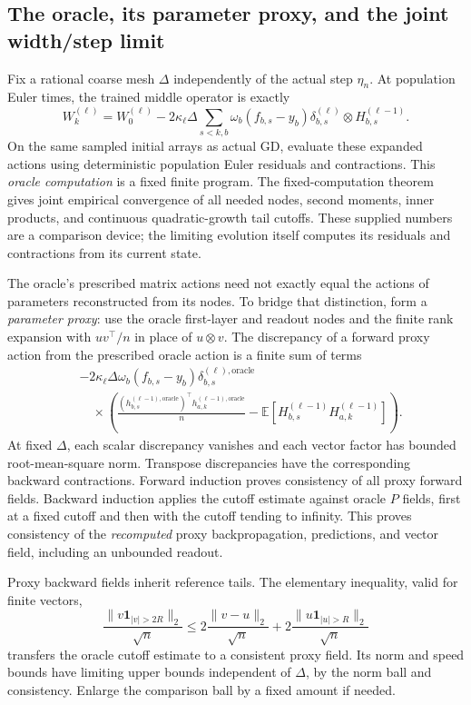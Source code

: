 \subsection{The oracle, its parameter proxy, and the joint width/step limit}
\label{app:oracle}

Fix a rational coarse mesh $\Delta$ independently of the actual step
$\eta_n$.  At population Euler times, the trained middle operator is
exactly
\[
 W_k^{(\ell)}=W_0^{(\ell)}
 -2\kappa_\ell\Delta\sum_{s<k,b}
 \omega_b(f_{b,s}-y_b)
       \delta_{b,s}^{(\ell)}\otimes H_{b,s}^{(\ell-1)}.
\]
On the same sampled initial arrays as actual GD, evaluate these expanded
actions using deterministic population Euler residuals and contractions.
This \emph{oracle computation} is a fixed finite program.  The
fixed-computation theorem gives joint empirical convergence of all
needed nodes, second moments, inner products, and continuous
quadratic-growth tail cutoffs.  These supplied numbers are a comparison
device; the limiting evolution itself computes its residuals and
contractions from its current state.

The oracle's prescribed matrix actions need not exactly equal the
actions of parameters reconstructed from its nodes.  To bridge that
distinction, form a \emph{parameter proxy}: use the oracle first-layer
and readout nodes and the finite rank expansion with
$uv^\top/n$ in place of $u\otimes v$.  The discrepancy of a forward
proxy action from the prescribed oracle action is a finite sum of terms
\begin{align*}
 &-2\kappa_\ell\Delta\omega_b(f_{b,s}-y_b)
       \delta_{b,s}^{(\ell),\mathrm{oracle}}\\
 &\quad\times\left(
 \frac{(h_{b,s}^{(\ell-1),\mathrm{oracle}})^\top
               h_{a,k}^{(\ell-1),\mathrm{oracle}}}{n}
 -\mathbb E[H_{b,s}^{(\ell-1)}H_{a,k}^{(\ell-1)}]
 \right).
\end{align*}
At fixed $\Delta$, each scalar discrepancy vanishes and each vector
factor has bounded root-mean-square norm.  Transpose discrepancies have
the corresponding backward contractions.  Forward induction proves
consistency of all proxy forward fields.  Backward induction applies
the cutoff estimate against oracle $P$ fields, first at a fixed cutoff
and then with the cutoff tending to infinity.  This proves consistency
of the \emph{recomputed} proxy backpropagation, predictions, and vector
field, including an unbounded readout.

Proxy backward fields inherit reference tails.  The elementary
inequality, valid for finite vectors,
\[
 \frac{\|v\mathbf{1}_{|v|>2R}\|_2}{\sqrt n}
 \le2\frac{\|v-u\|_2}{\sqrt n}
     +2\frac{\|u\mathbf{1}_{|u|>R}\|_2}{\sqrt n}
\]
transfers the oracle cutoff estimate to a consistent proxy field.
Its norm and speed bounds have limiting upper bounds independent of
$\Delta$, by the norm ball and consistency.  Enlarge the comparison
ball by a fixed amount if needed.

